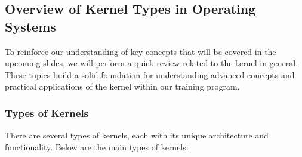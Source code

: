 \subsection{Overview of Kernel Types in Operating Systems}
To reinforce our understanding of key concepts that will be covered in the upcoming slides, we will perform a quick review related to the kernel in general. These topics build a solid foundation for understanding advanced concepts and practical applications of the kernel within our training program.

\subsubsection{Types of Kernels}
There are several types of kernels, each with its unique architecture and functionality. Below are the main types of kernels:
